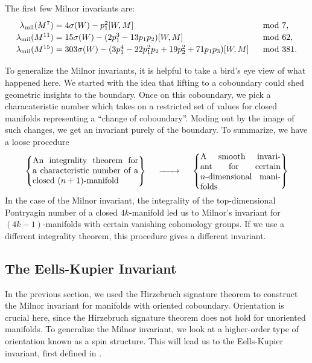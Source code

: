 \begin{example}
	The first few Milnor invariants are:
	\[
		\renewcommand{\arraystretch}{1.2}
		\begin{array}{r@{\;}ll}
			\milinv(M^7)
			 & = 4\sigma(W) - p_1^2[W, M]
			 & \mod 7,                                                        \\
			\milinv(M^{11})
			 & = 15\sigma(W) - (2p_1^3-13p_1p_2)[W,M]
			 & \mod 62,                                                       \\
			\milinv(M^{15})
			 & = 303\sigma(W) - (3p_1^4-22p_1^2p_2 + 19p_2^2 + 71p_1p_3)[W,M]
			 & \mod 381.
		\end{array}
	\]
\end{example}

To generalize the Milnor invariants, it is helpful to take a bird's eye view of what happened here. We started with the idea that lifting to a coboundary could shed geometric insights to the boundary. Once on this coboundary, we pick a characateristic number which takes on a restricted set of values for closed manifolds representing a ``change of coboundary''. Moding out by the image of such changes, we get an invariant purely of the boundary. To summarize, we have a loose procedure
\[
	\left\{\parbox{12.5em}{An integrality theorem for a characteristic number of a closed $(n+1)$-manifold}\right\}
	\quad\lkxto\quad
	\left\{\parbox{9.5em}{A smooth invariant for certain $n$-dimensional manifolds}\right\}
\]
In the case of the Milnor invariant, the integrality of the top-dimensional Pontryagin number of a closed $4k$-manifold led us to Milnor's invariant for $(4k-1)$-manifolds with certain vanishing cohomology groups.
If we use a different integrality theorem, this procedure gives a different invariant.

\subsection{The Eells-Kupier Invariant}\label{sec:eells-kupier-invariant}

In the previous section, we used the Hirzebruch signature theorem to construct the Milnor invariant for manifolds with oriented coboundary. Orientation is crucial here, since the Hirzebruch signature theorem does not hold for unoriented manifolds. To generalize the Milnor invariant, we look at a higher-order type of orientation known as a spin structure. This will lead us to the Eells-Kupier invariant, first defined in \cite{eellskupier1962}.

